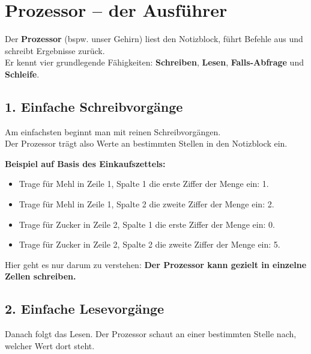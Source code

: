 \documentclass{article}
\begin{document}
    
      
        \section{Prozessor – der Ausführer}
        
Der \textbf{Prozessor} (bspw. unser Gehirn) liest den Notizblock, führt Befehle aus und schreibt Ergebnisse zurück.\\
          Er kennt vier grundlegende Fähigkeiten: \textbf{Schreiben}, \textbf{Lesen}, \textbf{Falls-Abfrage} und \textbf{Schleife}.


        \subsection{1. Einfache Schreibvorgänge}
        
Am einfachsten beginnt man mit reinen Schreibvorgängen.\\
          Der Prozessor trägt also Werte an bestimmten Stellen in den Notizblock ein.


        
\textbf{Beispiel auf Basis des Einkaufszettels:}

        \begin{itemize}
          \item Trage für Mehl in Zeile 1, Spalte 1 die erste Ziffer der Menge ein: 1.

          \item Trage für Mehl in Zeile 1, Spalte 2 die zweite Ziffer der Menge ein: 2.

          \item Trage für Zucker in Zeile 2, Spalte 1 die erste Ziffer der Menge ein: 0.

          \item Trage für Zucker in Zeile 2, Spalte 2 die zweite Ziffer der Menge ein: 5.

        \end{itemize}

        
Hier geht es nur darum zu verstehen: \textbf{Der Prozessor kann gezielt in einzelne Zellen schreiben.}


        \subsection{2. Einfache Lesevorgänge}
        
Danach folgt das Lesen. Der Prozessor schaut an einer bestimmten Stelle nach, welcher Wert dort steht.
\end{document}
